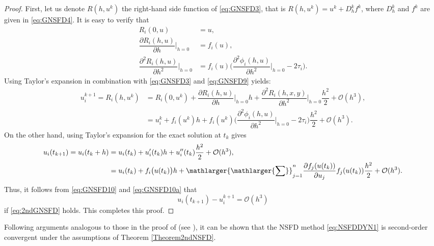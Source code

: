\documentclass[12pt]{article}
\theoremstyle{definition}
\theoremstyle{remark}
\numberwithin{equation}{section}
\begin{document}
\begin{proof}
First, let us denote $R(h, u^k)$ the right-hand side function of \eqref{eq:GNSFD3}, that is $R(h, u^k) = u^k + D^k_hf^k$, where $D^k_h$ and $f^k$ are given in \eqref{eq:GNSFD4}. It is easy to verify that
\begin{equation}\label{eq:GNSFD9}
\begin{split}
R_i(0, u) &= u,\\
\dfrac{\partial R_i(h, u)}{\partial h}\bigg|_{h = 0} &= f_i(u),\\
\dfrac{\partial^2 R_i(h, u)}{\partial h^2}\bigg|_{h = 0} &= f_i(u)\bigg(\dfrac{\partial^2 \phi_i(h, u)}{\partial h^2}\bigg|_{h = 0} - 2\tau_i\bigg).
\end{split}
\end{equation}
Using Taylor's expansion in combination with \eqref{eq:GNSFD3} and \eqref{eq:GNSFD9} yields:
\begin{equation}\label{eq:GNSFD10}
\begin{split}
u_i^{k + 1} = R_i(h, u^k) &= R_i(0, u^k) + \dfrac{\partial R_i(h, u)}{\partial h}\bigg|_{h = 0}h + \dfrac{\partial^2 R_i(h, x, y)}{\partial h^2}\bigg|_{h = 0} \dfrac{h^2}{2} + \mathcal{O}(h^3),\\
&= u_i^k + f_i(u^k)h + f_i(u^k)\bigg(\dfrac{\partial^2 \phi_i(h, u)}{\partial h^2}\bigg|_{h = 0} - 2\tau_i\bigg)\dfrac{h^2}{2} + \mathcal{O}(h^3).
\end{split}
\end{equation}
On the other hand, using Taylor's expansion for the exact solution at $t_k$ gives
\begin{equation}\label{eq:GNSFD10a}
\begin{split}
u_i(t_{k + 1}) = u_i(t_k + h) &= u_i(t_k) + u_i'(t_k)h + u_i''(t_k)\dfrac{h^2}{2} + \mathcal{O}(h^3),\\
&= u_i(t_k) + f_i\big(u(t_k)\big)h + \mathlarger{\mathlarger{\sum}}_{j = 1}^n\dfrac{\partial f_j(u(t_k))}{\partial u_j}f_j(u(t_k))\dfrac{h^2}{2} + \mathcal{O}(h^3).
\end{split}
\end{equation}
Thus, it follows from \eqref{eq:GNSFD10} and \eqref{eq:GNSFD10a} that
\begin{equation*}
u_i(t_{k + 1}) - u_i^{k+1} = \mathcal{O}(h^3)
\end{equation*}
if \eqref{eq:2ndGNSFD} holds. This completes this proof.
\end{proof}
%
%
Following arguments analogous to those in the proof of \cite[Theorem 5.2]{Cresson} (see \cite[Appendix B]{Cresson}), it can be shown that the NSFD method \eqref{eq:NSFDDYN1} is second-order convergent under the assumptions of Theorem \ref{Theorem2ndNSFD}.
\end{document}
